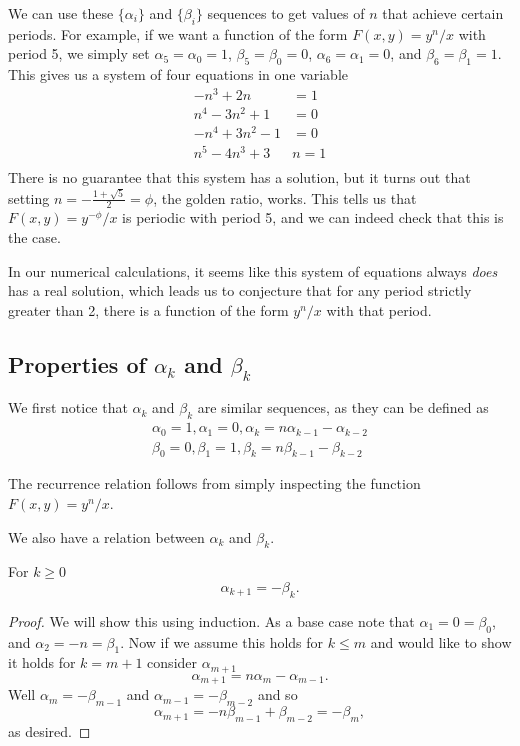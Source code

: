 \documentclass[12pt]{article}
\begin{document}
We can use these $\{\alpha_i\}$ and $\{\beta_i\}$ sequences to get values of $n$ that achieve certain periods. For example, if we want a function of the form $F(x,y) = y^n/x$ with period 5, we simply set $\alpha_5 = \alpha_0 = 1$, $\beta_5 = \beta_0 = 0$, $\alpha_6 = \alpha_1 = 0$, and $\beta_6 = \beta_1 = 1$. This gives us a system of four equations in one variable
\begin{align*}
-n^3+2n &= 1\\
n^4-3n^2+1&=0\\
-n^4+3n^2 -1&= 0\\
n^5-4n^3+3&n=1\\
\end{align*}
There is no guarantee that this system has a solution, but it turns out that setting $n = -\frac{1+\sqrt{5}}{2} = \phi$, the golden ratio, works. This tells us that $F(x,y) = y^{-\phi}/x$ is periodic with period 5, and we can indeed check that this is the case.

In our numerical calculations, it seems like this system of equations always \emph{does} has a real solution, which leads us to conjecture that for any period strictly greater than 2, there is a function of the form $y^n/x$ with that period.

\subsection{Properties of $\alpha_k$ and $\beta_k$}

We first notice that $\alpha_k$ and $\beta_k$ are similar sequences, as they can be defined as
\begin{align*}
\alpha_0 = 1, \alpha_1 = 0, \alpha_k = n\alpha_{k-1} - \alpha_{k-2}\\
\beta_0 = 0, \beta_1 = 1, \beta_k = n\beta_{k-1} - \beta_{k-2}
\end{align*}

The recurrence relation follows from simply inspecting the function $F(x,y) = y^n/x$.

We also have a relation between $\alpha_k$ and $\beta_k$. 
\begin{lemma} 
\label{ab} For $k\geq 0$
\begin{equation*}
\alpha_{k+1} = - \beta_{k}.
\end{equation*}
\end{lemma}
\begin{proof}
We will show this using induction. As a base case note that $\alpha_1 = 0 = \beta_0$, and $\alpha_2 = -n = \beta_1$. Now if we assume this holds for $k \leq m$ and would like to show it holds for $k = m+1$ consider $\alpha_{m+1}$
\begin{equation*}
\alpha_{m+1} = n \alpha_{m} - \alpha_{m-1}.
\end{equation*}
Well $\alpha_m = -\beta_{m-1}$ and $\alpha_{m-1} = - \beta_{m-2}$ and so 
\begin{equation*}
\alpha_{m+1} = - n \beta_{m-1} + \beta_{m-2} = -\beta_{m},
\end{equation*}
as desired.
\end{proof}
\end{document}
